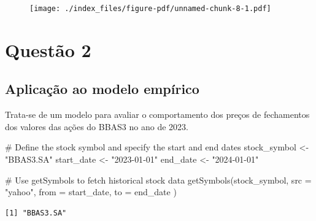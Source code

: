 \documentclass[
  letterpaper,
  DIV=11,
  numbers=noendperiod]{scrreprt}
\newenvironment{Shaded}{\begin{snugshade}}{\end{snugshade}}
\newcommand{\AttributeTok}[1]{\textcolor[rgb]{0.40,0.45,0.13}{#1}}
\newcommand{\CommentTok}[1]{\textcolor[rgb]{0.37,0.37,0.37}{#1}}
\newcommand{\FunctionTok}[1]{\textcolor[rgb]{0.28,0.35,0.67}{#1}}
\newcommand{\NormalTok}[1]{\textcolor[rgb]{0.00,0.23,0.31}{#1}}
\newcommand{\OtherTok}[1]{\textcolor[rgb]{0.00,0.23,0.31}{#1}}
\newcommand{\SpecialCharTok}[1]{\textcolor[rgb]{0.37,0.37,0.37}{#1}}
\newcommand{\StringTok}[1]{\textcolor[rgb]{0.13,0.47,0.30}{#1}}
\begin{document}
\begin{figure}[H]

{\centering \texttt{[image: ./index\_files/figure-pdf/unnamed-chunk-8-1.pdf]}

}

\end{figure}


\hypertarget{questuxe3o-2}{%
\chapter*{Questão 2}\label{questuxe3o-2}}


\hypertarget{aplicauxe7uxe3o-ao-modelo-empuxedrico-1}{%
\section*{Aplicação ao modelo
empírico}\label{aplicauxe7uxe3o-ao-modelo-empuxedrico-1}}


Trata-se de um modelo para avaliar o comportamento dos preços de
fechamentos dos valores das ações do BBAS3 no ano de 2023.

\begin{Shaded}
\begin{Highlighting}[]
\CommentTok{\# Define the stock symbol and specify the start and end dates}
\NormalTok{stock\_symbol }\OtherTok{\textless{}{-}} \StringTok{"BBAS3.SA"}
\NormalTok{start\_date }\OtherTok{\textless{}{-}} \StringTok{"2023{-}01{-}01"}
\NormalTok{end\_date }\OtherTok{\textless{}{-}} \StringTok{"2024{-}01{-}01"}

\CommentTok{\# Use getSymbols to fetch historical stock data}
\FunctionTok{getSymbols}\NormalTok{(stock\_symbol,}
    \AttributeTok{src =} \StringTok{"yahoo"}\NormalTok{,}
    \AttributeTok{from =}\NormalTok{ start\_date,}
    \AttributeTok{to =}\NormalTok{ end\_date}
\NormalTok{)}
\end{Highlighting}
\end{Shaded}

\begin{verbatim}
[1] "BBAS3.SA"
\end{verbatim}

\begin{Shaded}
\end{Shaded}
\end{document}
